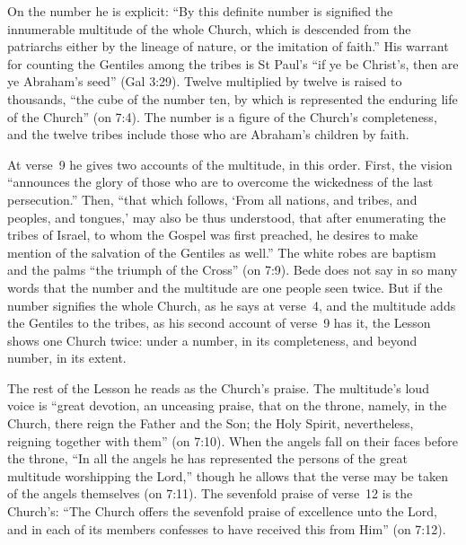 On the number he is explicit: ``By this definite number is signified the
innumerable multitude of the whole Church, which is descended from the
patriarchs either by the lineage of nature, or the imitation of faith.'' His
warrant for counting the Gentiles among the tribes is St Paul's ``if ye be
Christ's, then are ye Abraham's seed'' (Gal 3:29). Twelve multiplied by twelve
is raised to thousands, ``the cube of the number ten, by which is represented
the enduring life of the Church'' (on 7:4). The number is a figure of the
Church's completeness, and the twelve tribes include those who are Abraham's
children by faith.

At verse~9 he gives two accounts of the multitude, in this order. First, the
vision ``announces the glory of those who are to overcome the wickedness of the
last persecution.'' Then, ``that which follows, `From all nations, and tribes,
and peoples, and tongues,' may also be thus understood, that after enumerating
the tribes of Israel, to whom the Gospel was first preached, he desires to make
mention of the salvation of the Gentiles as well.'' The white robes are
baptism and the palms ``the triumph of the Cross'' (on 7:9). Bede does not say
in so many words that the number and the multitude are one people seen twice.
But if the number signifies the whole Church, as he says at verse~4, and the
multitude adds the Gentiles to the tribes, as his second account of verse~9
has it, the Lesson shows one Church twice: under a number, in its
completeness, and beyond number, in its extent.

The rest of the Lesson he reads as the Church's praise. The multitude's loud
voice is ``great devotion, an unceasing praise, that on the throne, namely, in
the Church, there reign the Father and the Son; the Holy Spirit, nevertheless,
reigning together with them'' (on 7:10). When the angels fall on their faces
before the throne, ``In all the angels he has represented the persons of the
great multitude worshipping the Lord,'' though he allows that the verse may be
taken of the angels themselves (on 7:11). The sevenfold praise of verse~12 is
the Church's: ``The Church offers the sevenfold praise of excellence unto the
Lord, and in each of its members confesses to have received this from Him''
(on 7:12).

